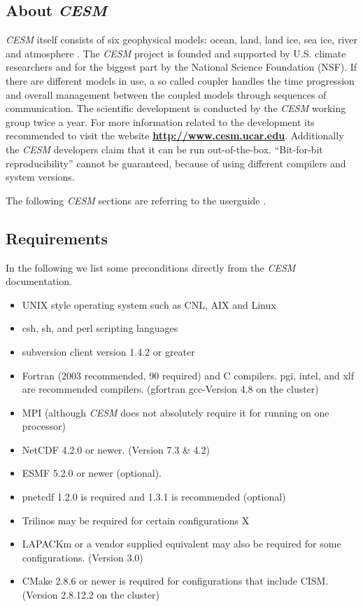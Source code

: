\documentclass[]{article}
\providecommand{\tightlist}{%
  \setlength{\itemsep}{0pt}\setlength{\parskip}{0pt}}
\begin{document}
\subsection{\texorpdfstring{About
\emph{CESM}}{About CESM}}\label{about-cesm}

\emph{CESM} itself consists of six geophysical models: ocean, land, land
ice, sea ice, river and atmosphere . The \emph{CESM} project is founded
and supported by U.S. climate researchers and for the biggest part by
the National Science Foundation (NSF). If there are different models in
use, a so called coupler handles the time progression and overall
management between the coupled models through sequences of
communication. The scientific development is conducted by the
\emph{CESM} working group twice a year. For more information related to
the development its recommended to visit the website
\href{http://www.cesm.ucar.edu}{\textbf{\textbf{http://www.cesm.ucar.edu}}}.
Additionally the \emph{CESM} developers claim that it can be run
out-of-the-box. ``Bit-for-bit reproducibility'' cannot be guaranteed,
because of using different compilers and system versions.

The following \emph{CESM} sections are referring to the userguide
\cite{CESMDocs}.

\subsection{Requirements}\label{requirements}

In the following we list some preconditions directly from the
\emph{CESM} documentation.

\begin{itemize}
\tightlist
\item
  UNIX style operating system such as CNL, AIX and Linux \checkmark
\item
  csh, sh, and perl scripting languages \checkmark
\item
  subversion client version 1.4.2 or greater \checkmark
\item
  Fortran (2003 recommended, 90 required) and C compilers. pgi, intel,
  and xlf are recommended compilers. \checkmark (gfortran gcc-Version
  4.8 on the cluster)
\item
  MPI (although \emph{CESM} does not absolutely require it for running
  on one processor) \checkmark
\item
  NetCDF 4.2.0 or newer. \checkmark (Version 7.3 \& 4.2)
\item
  ESMF 5.2.0 or newer (optional).
\item
  pnetcdf 1.2.0 is required and 1.3.1 is recommended (optional)
\item
  Trilinos may be required for certain configurations X
\item
  LAPACKm or a vendor supplied equivalent may also be required for some
  configurations. \checkmark (Version 3.0)
\item
  CMake 2.8.6 or newer is required for configurations that include CISM.
  \checkmark (Version 2.8.12.2 on the cluster)
\end{itemize}
\end{document}
